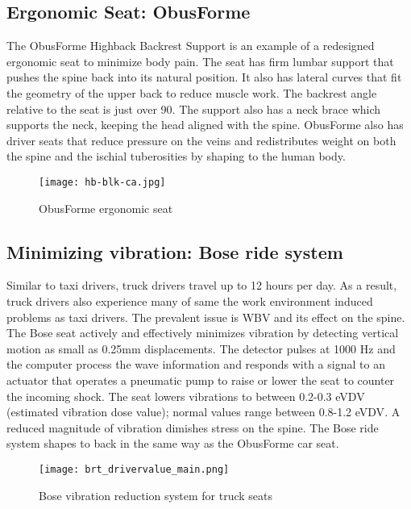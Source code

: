 \documentclass[11pt]{article}
\begin{document}
\subsection{Ergonomic Seat: ObusForme}
The ObusForme Highback Backrest Support is an example of a redesigned ergonomic seat to minimize body pain. 
The seat has firm lumbar support that pushes the spine back into its natural position. 
It also has lateral curves that fit the geometry of the upper back to reduce muscle work\cite{ObusFormebackrest}. 
The backrest angle relative to the seat is just over 90\textdegree. The support also has a neck brace which supports
the neck, keeping the head aligned with the spine\cite{ObusFormedriverchair}.
ObusForme also has driver seats that reduce pressure on the veins and redistributes weight 
on both the spine and the ischial tuberosities by shaping to the human body\cite{ObusFormecushion}.
\begin{figure}[h]
  \centering
  \texttt{[image: hb-blk-ca.jpg]}
  \caption{ObusForme ergonomic seat}
\end{figure}
\subsection{Minimizing vibration: Bose ride system}
Similar to taxi drivers, truck drivers travel up to 12 hours per day. As a result, truck drivers also experience 
many of same the work environment induced problems as taxi drivers. 
The prevalent  issue is WBV and its effect on the spine. The Bose seat actively and effectively minimizes vibration 
by detecting vertical motion as small as 0.25mm displacements. %
The detector pulses at 1000 Hz and the computer process the 
wave information and responds with a signal to an actuator that operates a pneumatic pump to raise or lower the seat to 
counter the incoming shock. The seat lowers vibrations to between 0.2-0.3 eVDV (estimated vibration dose value); normal values range 
between 0.8-1.2 eVDV\cite{Bosetruckseat}. A reduced magnitude of vibration dimishes stress on the spine. The Bose ride system shapes to back in the same way as the 
ObusForme car seat\cite{Bosetruckseat}.
\begin{figure}[h]
  \centering
  \texttt{[image: brt\_drivervalue\_main.png]}
  \caption{Bose vibration reduction system for truck seats}
\end{figure}
\end{document}
